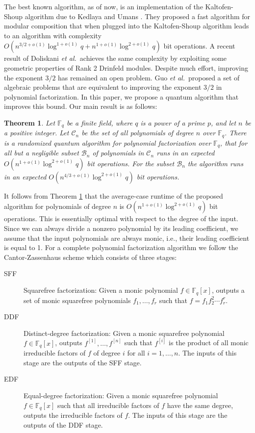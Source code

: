 \documentclass[11pt]{article}
\theoremstyle{plain}
\newtheorem{theorem}{Theorem}
\theoremstyle{definition}
\def\F{\ensuremath{\mathbb{F}}}
\begin{document}
The best known algorithm, as of now, is an implementation of the Kaltofen-Shoup algorithm due to 
Kedlaya and Umans \cite{kedlaya2011fast}. They proposed a fast algorithm for modular composition 
that when plugged into the Kaltofen-Shoup algorithm leads to an algorithm with complexity 
$O(n^{3/2 + o(1)}\log^{1 + o(1)}q + n^{1 + o(1)}\log^{2 + o(1)}q)$ bit operations. A recent 
result of Doliskani \textit{et al.}\,\cite{doliskani2017drinfeld} achieves the same complexity by 
exploiting some geometric properties of Rank 2 Drinfeld modules. Despite much effort, improving the 
exponent $3 / 2$ has remained an open problem. Guo \textit{et al.}\,\cite{guo2016alg} proposed a 
set of algebraic problems that are equivalent to improving the exponent $3 / 2$ in polynomial 
factorization. In this paper, we propose a quantum algorithm that improves this bound. Our main 
result is as follows:
\begin{theorem}
	\label{thm:main}
	Let $\F_q$ be a finite field, where $q$ is a power of a prime $p$, and let $n$ be a positive 
	integer. Let $\mathcal{C}_n$ be the set of all polynomials of degree $n$ over $\F_q$. There is 
	a randomized quantum algorithm for polynomial factorization over $\F_q$, that for all but a 
	negligible subset $\mathcal{B}_n$ of polynomials in $\mathcal{C}_n$ runs in an expected 
	$O(n^{1 + o(1)} \log^{2 + o(1)}q)$ bit operations. For the subset $\mathcal{B}_n$ the algorithm 
	runs in an expected $O(n^{4 / 3 + o(1)} \log^{2 + o(1)}q)$ bit operations.
\end{theorem}
It follows from Theorem \ref{thm:main} that the average-case runtime of the proposed algorithm for 
polynomials of degree $n$ is $O(n^{1 + o(1)} \log^{2 + o(1)}q)$ bit operations. This is essentially 
optimal with respect to the degree of the input. Since we can always divide a nonzero polynomial by 
its leading coefficient, we assume that the input polynomials are always monic, i.e., their leading 
coefficient is equal to 1. For a complete polynomial factorization algorithm we follow the 
Cantor-Zassenhaus scheme which consists of three stages:
\begin{description}
	\item[SFF] Squarefree factorization: Given a monic polynomial $f \in \F_q[x]$, outputs a set of 
	monic squarefree polynomials $f_1, \dots, f_r$ such that $f = f_1 f_2^2 \cdots f_r^r$.
	\item[DDF] Distinct-degree factorization: Given a monic squarefree polynomial $f \in \F_q[x]$, 
	outputs $f^{[1]}, \dots, f^{[n]}$ such that $f^{[i]}$ is the product of all monic irreducible	
	factors of $f$ of degree $i$ for all $i = 1, \dots, n$. The inputs of this stage are the 
	outputs of the SFF stage.
	\item[EDF] Equal-degree factorization: Given a monic squarefree polynomial $f \in \F_q[x]$ such 
	that all irreducible factors of $f$ have the same degree, outputs the irreducible factors of 
	$f$. The inputs of this stage are the outputs of the DDF stage.
\end{description}
\end{document}
